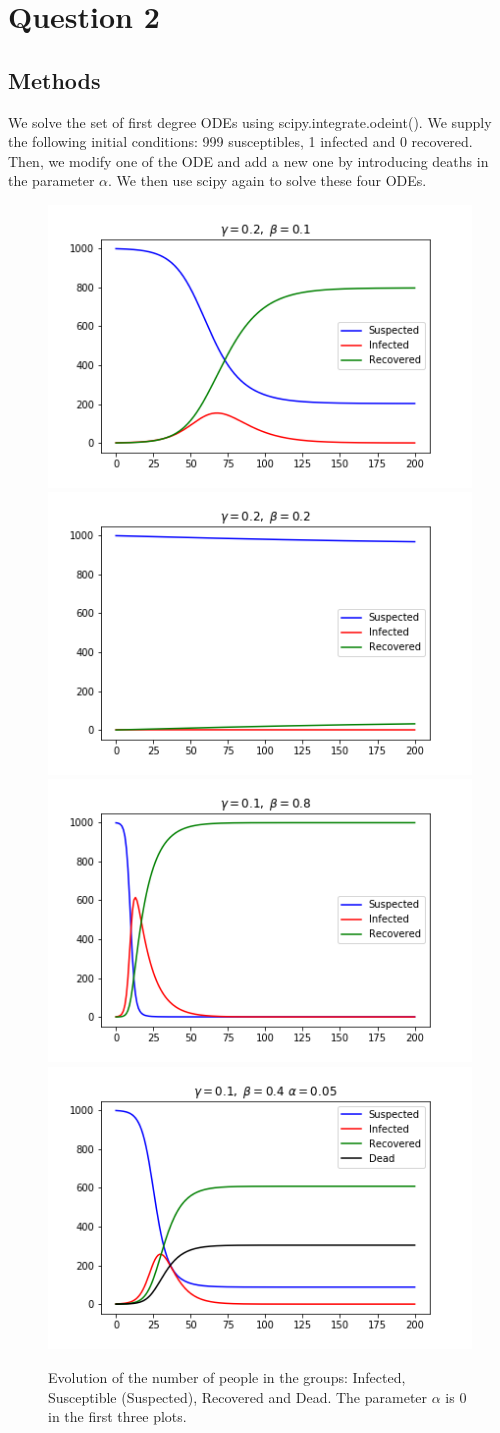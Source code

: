 \documentclass{article}
\begin{document}
\section{Question 2}
\subsection{Methods}
We solve the set of first degree ODEs using scipy.integrate.odeint(). We supply the following initial conditions: 999 susceptibles, 1 infected and 0 recovered. Then, we modify one of the ODE and add a new one by introducing deaths in the parameter $\alpha$. We then use scipy again to solve these four ODEs.

\begin{figure}[h]
\includegraphics[width = 0.5\columnwidth]{question2_1.png}
\includegraphics[width = 0.5\columnwidth]{question2_2.png}
\includegraphics[width = 0.5\columnwidth]{question2_3.png}
\includegraphics[width = 0.5\columnwidth]{question2_4.png}
\caption{Evolution of the number of people in the groups: Infected, Susceptible (Suspected), Recovered and Dead. The parameter $\alpha$ is 0 in the first three plots.}
\end{figure}
\end{document}
